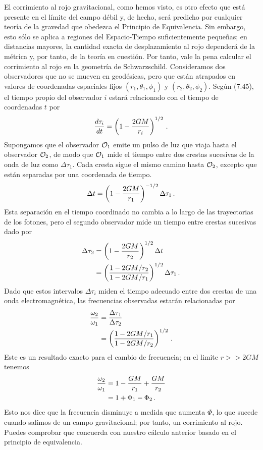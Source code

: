 \documentclass[11pt,b5paper,openany,twoside]{book}
\begin{document}
El corrimiento al rojo gravitacional, como hemos visto, es otro efecto que está presente en el límite del campo débil y, de hecho, será predicho por cualquier teoría de la gravedad que obedezca el Principio de Equivalencia.
Sin embargo, esto sólo se aplica a regiones del Espacio-Tiempo suficientemente pequeñas; en distancias mayores, la cantidad exacta de desplazamiento al rojo dependerá de la métrica y, por tanto, de la teoría en cuestión.
Por tanto, vale la pena calcular el corrimiento al rojo en la geometría de Schwarzschild.
Consideramos dos observadores que no se mueven en geodésicas, pero que están atrapados en valores de coordenadas espaciales fijos $(r_1,\theta_1,\phi_1)$ y $(r_2,\theta_2,\phi_2)$.
Según (7.45), el tiempo propio del observador $i$ estará relacionado con el tiempo de coordenadas $t$ por
\begin{equation}
{{d\tau_i}\over{dt}} = \left(1-{{2GM}\over{r_i}}\right)^{1/2}\,.
\label{7.58}
\end{equation}
Supongamos que el observador ${\cal O}_1$ emite un pulso de luz que viaja hasta el observador ${\cal O}_2$, de modo que ${\cal O}_1$ mide el tiempo entre dos crestas sucesivas de la onda de luz como $\Delta\tau_1$.
Cada cresta sigue el mismo camino hasta ${\cal O}_2$, excepto que están separadas por una coordenada de tiempo.
\begin{equation}
\Delta t= \left(1-{{2GM}\over{r_1}}\right)^{-1/2}\Delta \tau_1\,.
\label{7.59}
\end{equation}
Esta separación en el tiempo coordinado no cambia a lo largo de las trayectorias de los fotones, pero el segundo observador mide un tiempo entre crestas sucesivas dado por
\begin{align}
\Delta\tau_2  &=  \left(1-{{2GM}\over{r_2}}\right)^{1/2}
\Delta t \notag \\
&=  \left({{1-{{2GM}/{r_2}}}\over{1-{{2GM}/{r_1}}}}\right)^{1/2}
\Delta\tau_1\,.\label{7.60}
\end{align}
Dado que estos intervalos $\Delta\tau_i$ miden el tiempo adecuado entre dos crestas de una onda electromagnética, las frecuencias observadas estarán relacionadas por
\begin{align}
{{\omega_2}\over{\omega_1}} &=  {{\Delta\tau_1}\over
{\Delta\tau_2}} \notag \\
&=  \left({{1-{{2GM}/{r_1}}}\over{1-{{2GM}/{r_2}}}}\right)^{1/2}
\,.\label{7.61}
\end{align}
Este es un resultado exacto para el cambio de frecuencia; en el limite $r>>2GM$ tenemos
\begin{align}
{{\omega_2}\over{\omega_1}} &=  1-{{GM}\over{r_1}}+
{{GM}\over{r_2}} \notag \\
&=  1+\Phi_1-\Phi_2\,.\label{7.62}
\end{align}
Esto nos dice que la frecuencia disminuye a medida que aumenta $\Phi$, lo que sucede cuando salimos de un campo gravitacional; por tanto, un corrimiento al rojo.
Puedes comprobar que concuerda con nuestro cálculo anterior basado en el principio de equivalencia.
\end{document}
